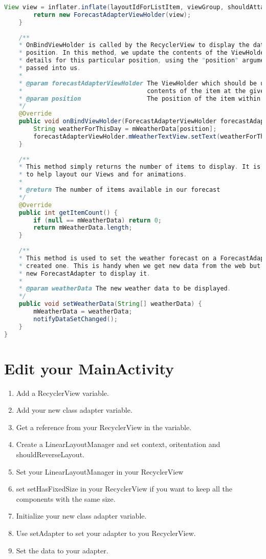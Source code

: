 \documentclass[12pt]{article} %
\begin{document}
\begin{lstlisting}[language=Java]
		View view = inflater.inflate(layoutIdForListItem, viewGroup, shouldAttachToParentImmediately);
		return new ForecastAdapterViewHolder(view);
	}
	
	/**
	* OnBindViewHolder is called by the RecyclerView to display the data at the specified
	* position. In this method, we update the contents of the ViewHolder to display the weather
	* details for this particular position, using the "position" argument that is conveniently
	* passed into us.
	*
	* @param forecastAdapterViewHolder The ViewHolder which should be updated to represent the
	*                                  contents of the item at the given position in the data set.
	* @param position                  The position of the item within the adapter's data set.
	*/
	@Override
	public void onBindViewHolder(ForecastAdapterViewHolder forecastAdapterViewHolder, int position) {
		String weatherForThisDay = mWeatherData[position];
		forecastAdapterViewHolder.mWeatherTextView.setText(weatherForThisDay);
	}
	
	/**
	* This method simply returns the number of items to display. It is used behind the scenes
	* to help layout our Views and for animations.
	*
	* @return The number of items available in our forecast
	*/
	@Override
	public int getItemCount() {
		if (null == mWeatherData) return 0;
		return mWeatherData.length;
	}
	
	/**
	* This method is used to set the weather forecast on a ForecastAdapter if we've already
	* created one. This is handy when we get new data from the web but don't want to create a
	* new ForecastAdapter to display it.
	*
	* @param weatherData The new weather data to be displayed.
	*/
	public void setWeatherData(String[] weatherData) {
		mWeatherData = weatherData;
		notifyDataSetChanged();
	}
}

\end{lstlisting}



\section{Edit your MainActivity}

\begin{enumerate}
	\item Add a RecyclerView variable.
	\item Add your new class adapter variable.
	\item Get a reference from your RecyclerView in the variable.
	\item Create a LinearLayoutManager and set context, oritentation and shouldReverseLayout.
	\item Set your LinearLayoutManager in your RecyclerView
	\item set setHasFixedSize in your RecyclerView if you want to keep all the components with the same size.
	\item Initialize your new class adapter variable.
	\item Use setAdapter to set your adapter to you RecyclerView.
	\item Set the data to your adapter.
	
\end{enumerate}
\end{document}
